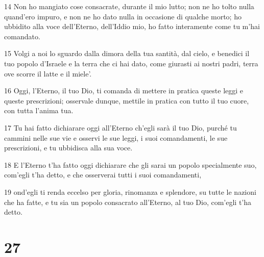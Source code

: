 \par 14 Non ho mangiato cose consacrate, durante il mio lutto; non ne ho tolto nulla quand'ero impuro, e non ne ho dato nulla in occasione di qualche morto; ho ubbidito alla voce dell'Eterno, dell'Iddio mio, ho fatto interamente come tu m'hai comandato.
\par 15 Volgi a noi lo sguardo dalla dimora della tua santità, dal cielo, e benedici il tuo popolo d'Israele e la terra che ci hai dato, come giurasti ai nostri padri, terra ove scorre il latte e il miele'.
\par 16 Oggi, l'Eterno, il tuo Dio, ti comanda di mettere in pratica queste leggi e queste prescrizioni; osservale dunque, mettile in pratica con tutto il tuo cuore, con tutta l'anima tua.
\par 17 Tu hai fatto dichiarare oggi all'Eterno ch'egli sarà il tuo Dio, purché tu cammini nelle sue vie e osservi le sue leggi, i suoi comandamenti, le sue prescrizioni, e tu ubbidisca alla sua voce.
\par 18 E l'Eterno t'ha fatto oggi dichiarare che gli sarai un popolo specialmente suo, com'egli t'ha detto, e che osserverai tutti i suoi comandamenti,
\par 19 ond'egli ti renda eccelso per gloria, rinomanza e splendore, su tutte le nazioni che ha fatte, e tu sia un popolo consacrato all'Eterno, al tuo Dio, com'egli t'ha detto.

\chapter{27}

